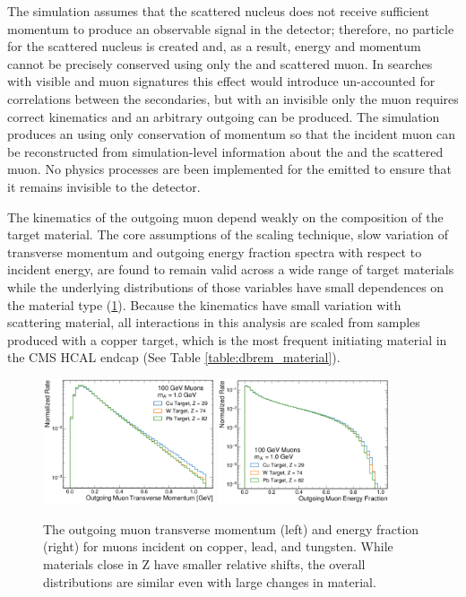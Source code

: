 The simulation assumes that the scattered nucleus does not receive sufficient momentum to produce an observable signal in the detector; therefore, no \gf particle for the scattered nucleus is created and, as a result, energy and momentum cannot be precisely conserved using only the \aprime and scattered muon. 
In searches with visible \aprime and muon signatures this effect would introduce un-accounted for correlations between the secondaries, but with an invisible \aprime only the muon requires correct kinematics and an arbitrary outgoing \aprime can be produced.  
The simulation produces an \aprime using only conservation of momentum so that the incident muon can be reconstructed from simulation-level information about the \aprime and the scattered muon.
No physics processes are been implemented for the emitted \aprime to ensure that it remains invisible to the detector.

The kinematics of the outgoing muon depend weakly on the composition of the target material.
The core assumptions of the scaling technique, slow variation of transverse momentum and outgoing energy fraction spectra with respect to incident energy, are found to remain valid across a wide range of target materials while the underlying distributions of those variables have small dependences on the material type (\cref{fig:dbrem_material}).
Because the kinematics have small variation with scattering material, all \dbrem interactions in this analysis are scaled from samples produced with a copper target, which is the most frequent \dbrem initiating material in the CMS HCAL endcap (See Table \ref{table:dbrem_material}).   

\begin{figure}[!htbp]
    \centering
    \includegraphics[width=0.45\textwidth]{figures/muon_material_comp_pt.pdf}
    \hspace{0.01\textwidth}
    \includegraphics[width=0.45\textwidth]{figures/muon_material_comp_efrac.pdf}
    \caption[
        Material dependence of \dbrem kinematics.
    ]{
        The outgoing muon transverse momentum (left) and energy fraction (right) for muons incident on copper, lead, and tungsten. While materials close in Z have smaller relative shifts, the overall distributions are similar even with large changes in material. 
    }
    \label{fig:dbrem_material}
\end{figure}

